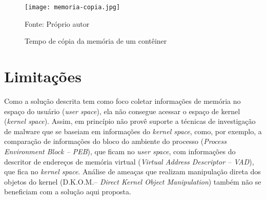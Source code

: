 
\begin{figure}[htb!]
\footnotesize
\caption{Tempo de cópia da memória de um contêiner}
\texttt{[image: memoria-copia.jpg]}
\centering
\label{fig:memoria-copia}
\begin{center}
Fonte: Próprio autor 
\end{center}
\end{figure}

\section{Limitações}
\label{sec:proposta-limit}

Como a solução descrita tem como foco coletar informações de memória no espaço do usuário (\textit{user space}), ela não consegue acessar o espaço de kernel (\textit{kernel space}). 
%
Assim, \fancyname em princípio não provê suporte a técnicas de investigação de malware que se baseiam em informações do \textit{kernel space}, como, por exemplo, a comparação de informações do bloco do ambiente do processo (\textit{Process Environment Block -- PEB}), que ficam no \textit{user space}, com informações do descritor de endereços de memória virtual (\textit{Virtual Address Descriptor -- VAD}), que fica no \textit{kernel space}. 
%
Análise de ameaças que realizam manipulação direta dos objetos do kernel (D.K.O.M.-- \textit{Direct Kernel Object Manipulation}) também não se beneficiam com a solução aqui proposta. 



